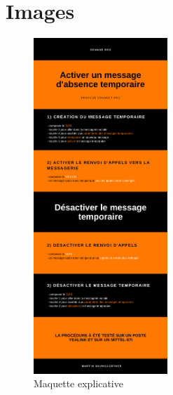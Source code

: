 \documentclass[12pt, a4paper]{article}
\begin{document}
\newpage
\section{Images}
\begin{figure}[h]
	\centering
	\includegraphics[width=0.45\textwidth]{img/maquette.png}
	\caption{Maquette explicative}
\end{figure}
\end{document}
